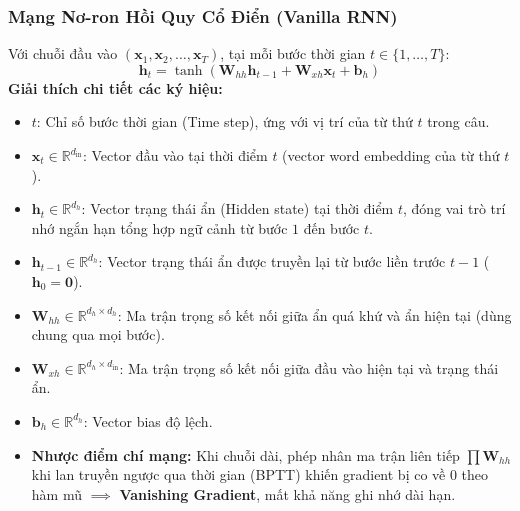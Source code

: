 \documentclass[10pt,a4paper]{article}
\begin{document}
\subsubsection{Mạng Nơ-ron Hồi Quy Cổ Điển (Vanilla RNN)}
Với chuỗi đầu vào $(\mathbf{x}_1, \mathbf{x}_2, \dots, \mathbf{x}_T)$, tại mỗi bước thời gian $t \in \{1, \dots, T\}$:
\begin{equation}
    \mathbf{h}_t = \tanh(\mathbf{W}_{hh} \mathbf{h}_{t-1} + \mathbf{W}_{xh} \mathbf{x}_t + \mathbf{b}_h)
\end{equation}
\textbf{Giải thích chi tiết các ký hiệu:}
\begin{itemize}[leftmargin=*]
    \item $t$: Chỉ số bước thời gian (Time step), ứng với vị trí của từ thứ $t$ trong câu.
    \item $\mathbf{x}_t \in \mathbb{R}^{d_{\text{in}}}$: Vector đầu vào tại thời điểm $t$ (vector word embedding của từ thứ $t$).
    \item $\mathbf{h}_t \in \mathbb{R}^{d_h}$: Vector trạng thái ẩn (Hidden state) tại thời điểm $t$, đóng vai trò trí nhớ ngắn hạn tổng hợp ngữ cảnh từ bước $1$ đến bước $t$.
    \item $\mathbf{h}_{t-1} \in \mathbb{R}^{d_h}$: Vector trạng thái ẩn được truyền lại từ bước liền trước $t-1$ ($\mathbf{h}_0 = \mathbf{0}$).
    \item $\mathbf{W}_{hh} \in \mathbb{R}^{d_h \times d_h}$: Ma trận trọng số kết nối giữa ẩn quá khứ và ẩn hiện tại (dùng chung qua mọi bước).
    \item $\mathbf{W}_{xh} \in \mathbb{R}^{d_h \times d_{\text{in}}}$: Ma trận trọng số kết nối giữa đầu vào hiện tại và trạng thái ẩn.
    \item $\mathbf{b}_h \in \mathbb{R}^{d_h}$: Vector bias độ lệch.
    \item \textbf{Nhược điểm chí mạng:} Khi chuỗi dài, phép nhân ma trận liên tiếp $\prod \mathbf{W}_{hh}$ khi lan truyền ngược qua thời gian (BPTT) khiến gradient bị co về 0 theo hàm mũ $\implies$ \textbf{Vanishing Gradient}, mất khả năng ghi nhớ dài hạn.
\end{itemize}
\end{document}

